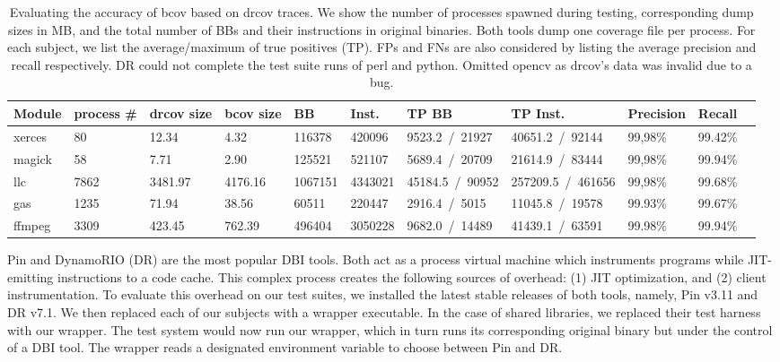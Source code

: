 \begin{table}[t!]
	\centering
	\setlength\tabcolsep{8.5pt}
	\small
	\caption{Evaluating the accuracy of \textsf{bcov} based on \textsf{drcov} traces. 
    We show the number of processes spawned during testing, corresponding dump sizes in MB,
    and the total number of BBs and their instructions in original binaries.
    Both tools dump one coverage file per process.
    For each subject, we list the average/maximum of true positives (TP).
    FPs and FNs are also considered by listing the average precision and recall respectively.		 
    DR could not complete the test suite runs of \textsf{perl} and \textsf{python}.
    Omitted \textsf{opencv} as \textsf{drcov}'s data was invalid due to a bug. 
    }
    \label{tab:coverage-accuracy}        
	\begin{tabularx}{0.99\textwidth}{@{}lllllllllll@{}}
        \\
		\textbf{Module} &
		\textbf{process \#} &
		\textbf{drcov size} &
		\textbf{bcov size} &
		\textbf{BB} &
		\textbf{Inst.} &
		\textbf{TP BB} &
		\textbf{TP Inst.} &
		\textbf{Precision} &
		\textbf{Recall} \\		
		\toprule
		
		xerces   & 80     & 12.34     & 4.32     & 116378   & 420096   & 9523.2~/~21927    & 40651.2~/~92144     & 99,98\%   &  99.42\%   \\ 
		magick   & 58     & 7.71      & 2.90     & 125521   & 521107   & 5689.4~/~20709    & 21614.9~/~83444     & 99,98\%   &  99.94\%    \\ 
		llc      & 7862   & 3481.97   & 4176.16  & 1067151  & 4343021  & 45184.5~/~90952   & 257209.5~/~461656   & 99,98\%   &  99.68\%  \\ 		
		gas      & 1235   & 71.94     & 38.56    & 60511    & 220447   & 2916.4~/~5015     & 11045.8~/~19578     & 99.93\%   &  99.67\%   \\ 
		ffmpeg   & 3309   & 423.45    & 762.39   & 496404   & 3050228  & 9682.0~/~14489    & 41439.1~/~63591     & 99.98\%   &  99.94\%   \\ 
		
		\bottomrule
	\end{tabularx}
\end{table}


Pin and DynamoRIO (DR) are the most popular DBI tools.
Both act as a process virtual machine which instruments programs while JIT-emitting instructions to a code cache.
This complex process creates the following sources of overhead: 
(1) JIT optimization, and (2) client instrumentation.
To evaluate this overhead on our test suites, we installed the latest stable releases of both tools, namely, Pin v3.11 and DR v7.1.
We then replaced each of our subjects with a wrapper executable.
In the case of shared libraries, we replaced their test harness with our wrapper.
The test system would now run our wrapper, which in turn runs its corresponding original binary but under the control of a DBI tool. 
The wrapper reads a designated environment variable to choose between Pin and DR.

